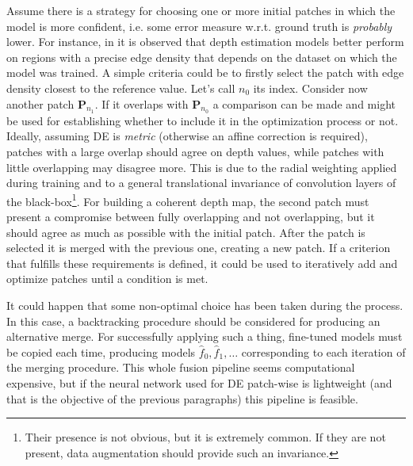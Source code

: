 Assume there is a strategy for choosing one or more initial patches in which the model is more confident, i.e. some error measure w.r.t. ground truth is \textit{probably} lower.
For instance, in \cite{BoostingDepth} it is observed that depth estimation models better perform on regions with a precise edge density that depends on the dataset on which the model was trained.
A simple criteria could be to firstly select the patch with edge density closest to the reference value.
Let's call $n_{0}$ its index.
Consider now another patch $\mathbf{P}_{n_{1}}$.
If it overlaps with $\mathbf{P}_{n_{0}}$ a comparison can be made and might be used for establishing whether to include it in the optimization process or not.
Ideally, assuming DE is \textit{metric} (otherwise an affine correction is required), patches with a large overlap should agree on depth values, while patches with little overlapping may disagree more.
This is due to the radial weighting applied during training and to a general translational invariance of convolution layers of the black-box\footnote{Their presence is not obvious, but it is extremely common. If they are not present, data augmentation should provide such an invariance.}.
For building a coherent depth map, the second patch must present a compromise between fully overlapping and not overlapping, but it should agree as much as possible with the initial patch.
After the patch is selected it is merged with the previous one, creating a new patch.
If a criterion that fulfills these requirements is defined, it could be used to iteratively add and optimize patches until a condition is met.

It could happen that some non-optimal choice has been taken during the process.
In this case, a backtracking procedure should be considered for producing an alternative merge.
For successfully applying such a thing, fine-tuned models must be copied each time, producing models $\hat{f}_{0}, \hat{f}_{1}, \dotsc$ corresponding to each iteration of the merging procedure.
This whole fusion pipeline seems computational expensive, but if the neural network used for DE patch-wise is lightweight (and that is the objective of the previous paragraphs) this pipeline is feasible.

